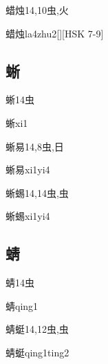 \begin{Entry}{蜡烛}{14,10}{⾍,⽕}
  \begin{Phonetics}{蜡烛}{la4zhu2}[][HSK 7-9]
  \end{Phonetics}
\end{Entry}

\subsection*{蜥}

\begin{Entry}{蜥}{14}{⾍}
  \begin{Phonetics}{蜥}{xi1}
  \end{Phonetics}
\end{Entry}

\begin{Entry}{蜥易}{14,8}{⾍,⽇}
  \begin{Phonetics}{蜥易}{xi1yi4}
  \end{Phonetics}
\end{Entry}

\begin{Entry}{蜥蜴}{14,14}{⾍,⾍}
  \begin{Phonetics}{蜥蜴}{xi1yi4}
  \end{Phonetics}
\end{Entry}

\subsection*{蜻}

\begin{Entry}{蜻}{14}{⾍}
  \begin{Phonetics}{蜻}{qing1}
  \end{Phonetics}
\end{Entry}

\begin{Entry}{蜻蜓}{14,12}{⾍,⾍}
  \begin{Phonetics}{蜻蜓}{qing1ting2}
  \end{Phonetics}
\end{Entry}

